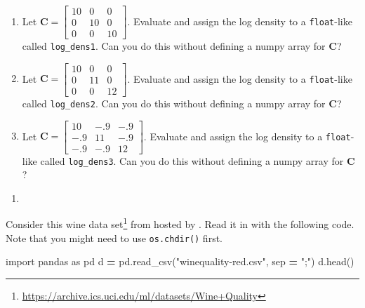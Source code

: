 \documentclass[
  12pt,
  krantz2]{krantz}
\makeatletter
\newenvironment{Shaded}{\begin{snugshade}}{\end{snugshade}}
\newcommand{\ImportTok}[1]{#1}
\newcommand{\NormalTok}[1]{#1}
\newcommand{\OperatorTok}[1]{\textcolor[rgb]{0.43,0.43,0.43}{\textbf{#1}}}
\newcommand{\StringTok}[1]{\textcolor[rgb]{0.5,0.5,0.5}{#1}}
\providecommand{\tightlist}{%
  \setlength{\itemsep}{0pt}\setlength{\parskip}{0pt}}
\renewcommand{\href}[2]{#2\footnote{\url{#1}}}
\newenvironment{kframe}{%
\medskip{}
\setlength{\fboxsep}{.8em}
 \def\at@end@of@kframe{}%
 \ifinner\ifhmode%
  \def\at@end@of@kframe{\end{minipage}}%
  \begin{minipage}{\columnwidth}%
 \fi\fi%
 \def\FrameCommand##1{\hskip\@totalleftmargin \hskip-\fboxsep
 \colorbox{shadecolor}{##1}\hskip-\fboxsep
     \hskip-\linewidth \hskip-\@totalleftmargin \hskip\columnwidth}%
 \MakeFramed {\advance\hsize-\width
   \@totalleftmargin\z@ \linewidth\hsize
   \@setminipage}}%
 {\par\unskip\endMakeFramed%
 \at@end@of@kframe}
\renewenvironment{Shaded}{\begin{kframe}}{\end{kframe}}
\makeatother
\begin{document}
\begin{enumerate}
\def\labelenumi{\alph{enumi})}
\item
  Let \(\mathbf{C} = \begin{bmatrix} 10 & 0 & 0 \\ 0 & 10 & 0 \\ 0 & 0 & 10 \end{bmatrix}\). Evaluate and assign the log density to a \texttt{float}-like called \texttt{log\_dens1}. Can you do this without defining a numpy array for \(\mathbf{C}\)?
\item
  Let \(\mathbf{C} = \begin{bmatrix} 10 & 0 & 0 \\ 0 & 11 & 0 \\ 0 & 0 & 12 \end{bmatrix}\). Evaluate and assign the log density to a \texttt{float}-like called \texttt{log\_dens2}. Can you do this without defining a numpy array for \(\mathbf{C}\)?
\item
  Let \(\mathbf{C} = \begin{bmatrix} 10 & -.9 & -.9 \\ -.9 & 11 & -.9 \\ -.9 & -.9 & 12 \end{bmatrix}\). Evaluate and assign the log density to a \texttt{float}-like called \texttt{log\_dens3}. Can you do this without defining a numpy array for \(\mathbf{C}\)?
\end{enumerate}

\begin{enumerate}
\def\labelenumi{\arabic{enumi}.}
\setcounter{enumi}{1}
\tightlist
\item
\end{enumerate}

Consider this \href{https://archive.ics.uci.edu/ml/datasets/Wine+Quality}{wine data set} from \citep{wine_data} hosted by \citep{uci_data}. Read it in with the following code. Note that you might need to use \texttt{os.chdir()} first.

\begin{Shaded}
\begin{Highlighting}[]
\ImportTok{import}\NormalTok{ pandas }\ImportTok{as}\NormalTok{ pd}
\NormalTok{d }\OperatorTok{=}\NormalTok{ pd.read\_csv(}\StringTok{"winequality{-}red.csv"}\NormalTok{, sep }\OperatorTok{=} \StringTok{";"}\NormalTok{)}
\NormalTok{d.head()}
\end{Highlighting}
\end{Shaded}
\end{document}
